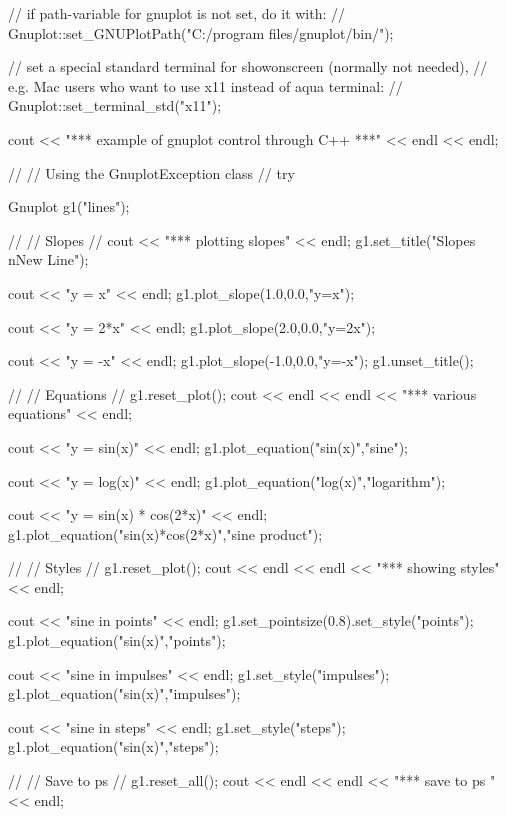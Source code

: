 \begin{DoxyCode}
{
    // if path-variable for gnuplot is not set, do it with:
    // Gnuplot::set_GNUPlotPath("C:/program files/gnuplot/bin/");

    // set a special standard terminal for showonscreen (normally not needed),
    //   e.g. Mac users who want to use x11 instead of aqua terminal:
    // Gnuplot::set_terminal_std("x11");

    cout << "*** example of gnuplot control through C++ ***" << endl << endl;

    //
    // Using the GnuplotException class
    //
    try
    {
        Gnuplot g1("lines");

        //
        // Slopes
        //
        cout << "*** plotting slopes" << endl;
        g1.set_title("Slopes\\nNew Line");

        cout << "y = x" << endl;
        g1.plot_slope(1.0,0.0,"y=x");

        cout << "y = 2*x" << endl;
        g1.plot_slope(2.0,0.0,"y=2x");

        cout << "y = -x" << endl;
        g1.plot_slope(-1.0,0.0,"y=-x");
        g1.unset_title();

        //
        // Equations
        //
        g1.reset_plot();
        cout << endl << endl << "*** various equations" << endl;

        cout << "y = sin(x)" << endl;
        g1.plot_equation("sin(x)","sine");

        cout << "y = log(x)" << endl;
        g1.plot_equation("log(x)","logarithm");

        cout << "y = sin(x) * cos(2*x)" << endl;
        g1.plot_equation("sin(x)*cos(2*x)","sine product");

        //
        // Styles
        //
        g1.reset_plot();
        cout << endl << endl << "*** showing styles" << endl;

        cout << "sine in points" << endl;
        g1.set_pointsize(0.8).set_style("points");
        g1.plot_equation("sin(x)","points");

        cout << "sine in impulses" << endl;
        g1.set_style("impulses");
        g1.plot_equation("sin(x)","impulses");

        cout << "sine in steps" << endl;
        g1.set_style("steps");
        g1.plot_equation("sin(x)","steps");

        //
        // Save to ps
        //
        g1.reset_all();
        cout << endl << endl << "*** save to ps " << endl;

}}
\end{DoxyCode}
